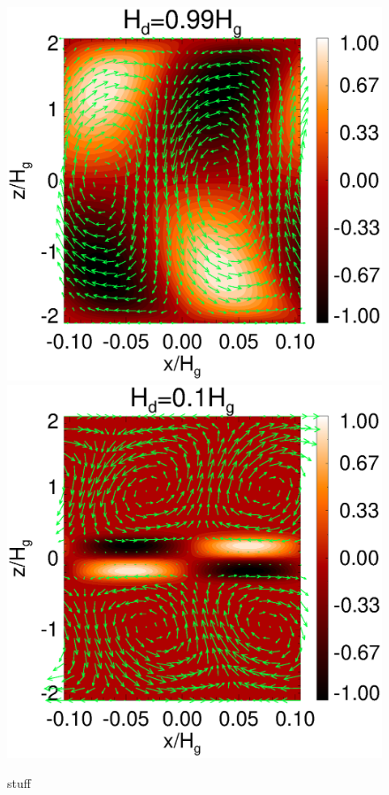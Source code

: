 \begin{figure}
  \includegraphics[scale=0.32, clip=true, trim=0.5cm 0cm 3cm 0cm]{figures/result2d_Hd1.ps}\includegraphics[scale=0.32, clip=true, trim=1.8cm 0cm 0cm 0cm]{figures/result2d_Hd0d1.ps} 
  \caption{
    stuff
    \label{result2d_fixZ}
    }
\end{figure}
